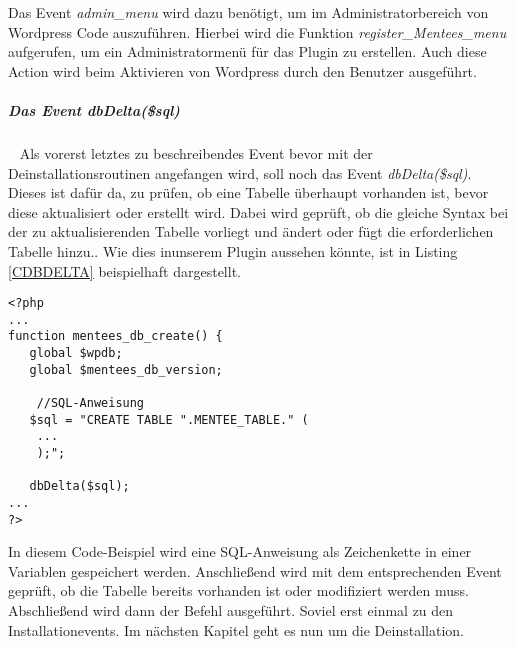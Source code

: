 Das Event \emph{admin\_menu} wird dazu benötigt, um im Administratorbereich von Wordpress Code auszuführen.
Hierbei wird die Funktion \emph{register\_Mentees\_menu} aufgerufen, um ein Administratormenü für das Plugin zu erstellen. \newline
Auch diese Action wird beim Aktivieren von Wordpress durch den Benutzer ausgeführt. 
\subparagraph{Das Event \emph{dbDelta(\$sql)}}\ \newline
Als vorerst letztes zu beschreibendes Event bevor mit der Deinstallationsroutinen angefangen wird, soll noch das Event \emph{dbDelta(\$sql)}.\newline
Dieses ist dafür da, zu prüfen, ob eine Tabelle überhaupt vorhanden ist, bevor diese aktualisiert oder erstellt wird. Dabei wird geprüft, ob die gleiche Syntax bei der zu aktualisierenden Tabelle vorliegt und ändert oder fügt die erforderlichen Tabelle hinzu..\newline
Wie dies inunserem Plugin aussehen könnte, ist in Listing \ref{CDBDELTA} beispielhaft dargestellt.
\begin{lstlisting}
<?php
...
function mentees_db_create() {
   global $wpdb;
   global $mentees_db_version;

	//SQL-Anweisung      
   $sql = "CREATE TABLE ".MENTEE_TABLE." (
	...
    );";
    
   dbDelta($sql);
...
?>
\end{lstlisting}
In diesem Code-Beispiel wird eine SQL-Anweisung als Zeichenkette in einer Variablen gespeichert werden. Anschließend wird mit dem entsprechenden Event geprüft, ob die Tabelle bereits vorhanden ist oder modifiziert werden muss. Abschließend wird dann der Befehl ausgeführt.\newline
Soviel erst einmal zu den Installationevents. Im nächsten Kapitel geht es nun um die Deinstallation.
